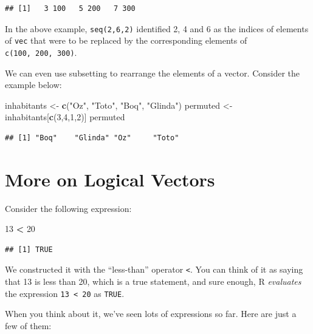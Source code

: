 \documentclass[]{book}
\makeatletter
\newenvironment{Shaded}{\begin{snugshade}}{\end{snugshade}}
\newcommand{\KeywordTok}[1]{\textcolor[rgb]{0.13,0.29,0.53}{\textbf{#1}}}
\newcommand{\DecValTok}[1]{\textcolor[rgb]{0.00,0.00,0.81}{#1}}
\newcommand{\StringTok}[1]{\textcolor[rgb]{0.31,0.60,0.02}{#1}}
\newcommand{\OperatorTok}[1]{\textcolor[rgb]{0.81,0.36,0.00}{\textbf{#1}}}
\newcommand{\NormalTok}[1]{#1}
\newenvironment{kframe}{%
\medskip{}
\setlength{\fboxsep}{.8em}
 \def\at@end@of@kframe{}%
 \ifinner\ifhmode%
  \def\at@end@of@kframe{\end{minipage}}%
  \begin{minipage}{\columnwidth}%
 \fi\fi%
 \def\FrameCommand##1{\hskip\@totalleftmargin \hskip-\fboxsep
 \colorbox{shadecolor}{##1}\hskip-\fboxsep
     \hskip-\linewidth \hskip-\@totalleftmargin \hskip\columnwidth}%
 \MakeFramed {\advance\hsize-\width
   \@totalleftmargin\z@ \linewidth\hsize
   \@setminipage}}%
 {\par\unskip\endMakeFramed%
 \at@end@of@kframe}
\renewenvironment{Shaded}{\begin{kframe}}{\end{kframe}}
\theoremstyle{definition}
\theoremstyle{definition}
\theoremstyle{definition}
\theoremstyle{remark}
\makeatother
\begin{document}
\begin{verbatim}
## [1]   3 100   5 200   7 300
\end{verbatim}

In the above example, \texttt{seq(2,6,2)} identified 2, 4 and 6 as the
indices of elements of \texttt{vec} that were to be replaced by the
corresponding elements of \texttt{c(100,\ 200,\ 300)}.

We can even use subsetting to rearrange the elements of a vector.
Consider the example below:

\begin{Shaded}
\begin{Highlighting}[]
\NormalTok{inhabitants <-}\StringTok{ }\KeywordTok{c}\NormalTok{(}\StringTok{"Oz"}\NormalTok{, }\StringTok{"Toto"}\NormalTok{, }\StringTok{"Boq"}\NormalTok{, }\StringTok{"Glinda"}\NormalTok{)}
\NormalTok{permuted <-}\StringTok{ }\NormalTok{inhabitants[}\KeywordTok{c}\NormalTok{(}\DecValTok{3}\NormalTok{,}\DecValTok{4}\NormalTok{,}\DecValTok{1}\NormalTok{,}\DecValTok{2}\NormalTok{)]}
\NormalTok{permuted}
\end{Highlighting}
\end{Shaded}

\begin{verbatim}
## [1] "Boq"    "Glinda" "Oz"     "Toto"
\end{verbatim}

\section{More on Logical Vectors}\label{more-on-logical-vectors}

Consider the following expression:

\begin{Shaded}
\begin{Highlighting}[]
\DecValTok{13} \OperatorTok{<}\StringTok{ }\DecValTok{20}
\end{Highlighting}
\end{Shaded}

\begin{verbatim}
## [1] TRUE
\end{verbatim}

We constructed it with the ``less-than'' operator \texttt{\textless{}}.
You can think of it as saying that 13 is less than 20, which is a true
statement, and sure enough, R \emph{evaluates} the expression
\texttt{13\ \textless{}\ 20} as \texttt{TRUE}.

When you think about it, we've seen lots of expressions so far. Here are
just a few of them:
\end{document}
